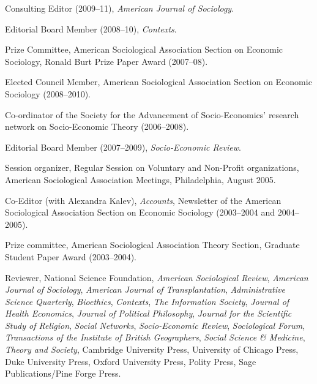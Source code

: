 \documentclass[11pt]{article}
\begin{document}
\medskip

\medskip

\ind Consulting Editor (2009--11), \emph{American Journal of Sociology}.

\ind Editorial Board Member (2008--10), \emph{Contexts}. 

\ind Prize Committee, American Sociological Association Section on Economic Sociology, Ronald Burt Prize Paper Award (2007--08).

\ind Elected Council Member, American Sociological Association Section on Economic
Sociology (2008--2010). 

\ind Co-ordinator of the Society for the Advancement of Socio-Economics' research network on Socio-Economic Theory (2006--2008). 

\ind Editorial Board Member (2007--2009), \emph{Socio-Economic Review}.

\ind Session organizer, Regular Session on Voluntary and Non-Profit organizations, American Sociological Association Meetings, Philadelphia, August 2005.

\ind Co-Editor (with Alexandra Kalev), \emph{Accounts}, Newsletter of the American Sociological Association Section on Economic Sociology (2003--2004 and 2004--2005).

\ind Prize committee, American Sociological Association Theory Section, Graduate Student Paper Award (2003--2004).

\ind Reviewer, National Science Foundation, \emph{American
  Sociological Review}, \emph{American Journal of Sociology},
\emph{American Journal of Transplantation}, \emph{Administrative
  Science Quarterly}, \emph{Bioethics}, \emph{Contexts}, \emph{The Information
  Society}, \emph{Journal of Health Economics}, \emph{Journal of Political Philosophy}, \emph{Journal for the Scientific Study of Religion}, \emph{Social Networks}, \emph{Socio-Economic Review}, \emph{Sociological Forum}, \emph{Transactions of the Institute of British Geographers}, \emph{Social Science \& Medicine}, \emph{Theory and Society}, Cambridge University Press, University of Chicago Press, Duke University Press, Oxford University Press, Polity Press, Sage Publications/Pine Forge Press.
\end{document}

